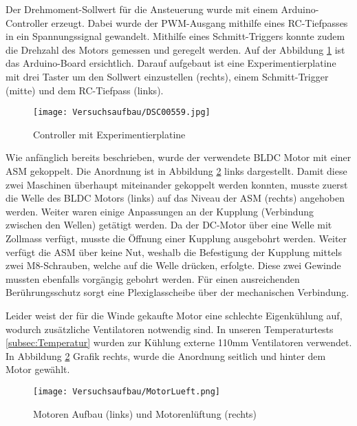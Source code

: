 Der Drehmoment-Sollwert für die Ansteuerung wurde mit einem Arduino-Controller erzeugt. Dabei wurde der PWM-Ausgang mithilfe eines RC-Tiefpasses in ein Spannungssignal gewandelt. Mithilfe eines Schmitt-Triggers konnte zudem die Drehzahl des Motors gemessen und geregelt werden. Auf der Abbildung \ref{fig:Mikrocontroller} ist das Arduino-Board ersichtlich. Darauf aufgebaut ist eine Experimentierplatine mit drei Taster um den Sollwert einzustellen (rechts), einem Schmitt-Trigger (mitte) und dem RC-Tiefpass (links).

\begin{figure}[H]
	\begin{center}
		\texttt{[image: Versuchsaufbau/DSC00559.jpg]}
		\caption[Controller]{Controller mit Experimentierplatine}
		\label{fig:Mikrocontroller}
	\end{center}
\end{figure}

Wie anfänglich bereits beschrieben, wurde der verwendete BLDC Motor mit einer ASM gekoppelt. Die Anordnung ist in Abbildung \ref{fig:MotorenLueftung} links dargestellt. Damit diese zwei Maschinen überhaupt miteinander gekoppelt werden konnten, musste zuerst die Welle des BLDC Motors (links) auf das Niveau der ASM (rechts) angehoben werden. Weiter waren einige Anpassungen an der Kupplung (Verbindung zwischen den Wellen) getätigt werden. Da der DC-Motor über eine Welle mit Zollmass verfügt, musste die Öffnung einer Kupplung ausgebohrt werden. Weiter verfügt die ASM über keine Nut, weshalb die Befestigung der Kupplung mittels zwei M8-Schrauben, welche auf die Welle drücken, erfolgte. Diese zwei Gewinde mussten ebenfalls vorgängig gebohrt werden. Für einen ausreichenden Berührungsschutz sorgt eine Plexiglasscheibe über der mechanischen Verbindung.


Leider weist der für die Winde gekaufte Motor eine schlechte Eigenkühlung auf, wodurch zusätzliche Ventilatoren notwendig sind. In unseren Temperaturtests \ref{subsec:Temperatur} wurden zur Kühlung externe 110mm Ventilatoren verwendet. In Abbildung \ref{fig:MotorenLueftung} Grafik rechts, wurde die Anordnung seitlich und hinter dem Motor gewählt.
\begin{figure}[H]
	\begin{center}
		\texttt{[image: Versuchsaufbau/MotorLueft.png]}
		\caption[Motoren Aufbau und Motorenlüftung]{Motoren Aufbau (links) und Motorenlüftung (rechts)}
		\label{fig:MotorenLueftung}
	\end{center}
\end{figure}

